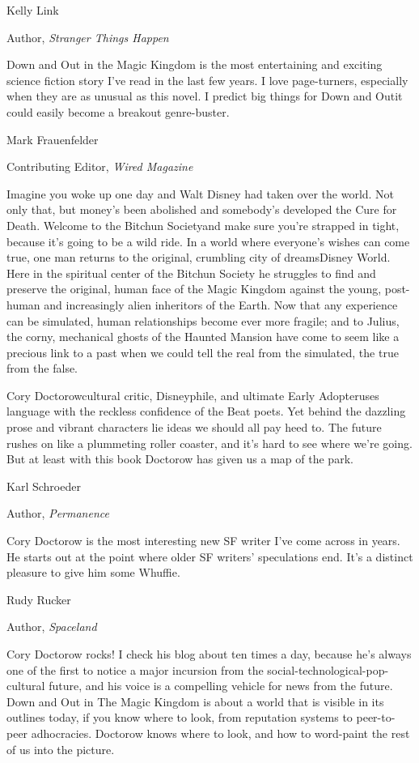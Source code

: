 Kelly Link

Author, \emph{Stranger Things Happen}

Down and Out in the Magic Kingdom is the most entertaining and
exciting science fiction story I've read in the last few years. I
love page-turners, especially when they are as unusual as this
novel. I predict big things for Down and Out{\dash}it could easily become
a breakout genre-buster.

Mark Frauenfelder

Contributing Editor, \emph{Wired Magazine}

Imagine you woke up one day and Walt Disney had taken over the
world. Not only that, but money's been abolished and somebody's
developed the Cure for Death. Welcome to the Bitchun Society{\dash}and
make sure you're strapped in tight, because it's going to be a wild
ride. In a world where everyone's wishes can come true, one man
returns to the original, crumbling city of dreams{\dash}Disney World.
Here in the spiritual center of the Bitchun Society he struggles to
find and preserve the original, human face of the Magic Kingdom
against the young, post-human and increasingly alien inheritors of
the Earth. Now that any experience can be simulated, human
relationships become ever more fragile; and to Julius, the corny,
mechanical ghosts of the Haunted Mansion have come to seem like a
precious link to a past when we could tell the real from the
simulated, the true from the false.

Cory Doctorow{\dash}cultural critic, Disneyphile, and ultimate Early
Adopter{\dash}uses language with the reckless confidence of the Beat
poets. Yet behind the dazzling prose and vibrant characters lie
ideas we should all pay heed to. The future rushes on like a
plummeting roller coaster, and it's hard to see where we're going.
But at least with this book Doctorow has given us a map of the
park.

Karl Schroeder

Author, \emph{Permanence}

Cory Doctorow is the most interesting new SF writer I've come
across in years. He starts out at the point where older SF writers'
speculations end. It's a distinct pleasure to give him some
Whuffie.

Rudy Rucker

Author, \emph{Spaceland}

Cory Doctorow rocks! I check his blog about ten times a day,
because he's always one of the first to notice a major incursion
from the social-technological-pop-cultural future, and his voice is
a compelling vehicle for news from the future. Down and Out in The
Magic Kingdom is about a world that is visible in its outlines
today, if you know where to look, from reputation systems to
peer-to-peer adhocracies. Doctorow knows where to look, and how to
word-paint the rest of us into the picture.

